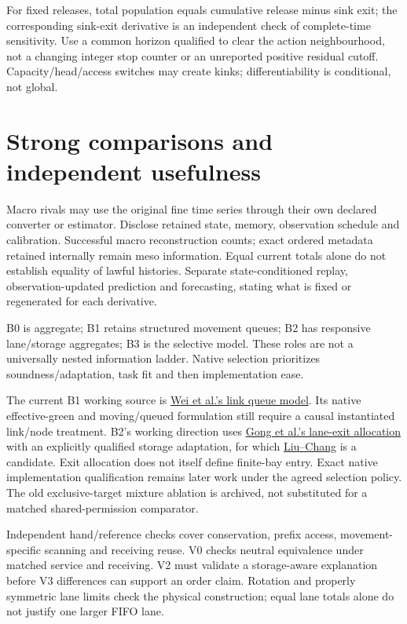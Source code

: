 \documentclass[11pt,a4paper]{article}
\begin{document}
For fixed releases, total population equals cumulative release minus
sink exit; the corresponding sink-exit derivative is an independent
check of complete-time sensitivity. Use a common horizon qualified to
clear the action neighbourhood, not a changing integer stop counter or
an unreported positive residual cutoff. Capacity/head/access switches
may create kinks; differentiability is conditional, not global.

\section{Strong comparisons and independent usefulness}

Macro rivals may use the original fine time series through their own
declared converter or estimator. Disclose retained state, memory,
observation schedule and calibration. Successful macro reconstruction
counts; exact ordered metadata retained internally remain meso information.
Equal current totals alone do not establish equality of lawful histories.
Separate state-conditioned replay, observation-updated prediction and
forecasting, stating what is fixed or regenerated for each derivative.

B0 is aggregate; B1 retains structured movement queues; B2 has responsive
lane/storage aggregates; B3 is the selective model. These roles are not
a universally nested information ladder. Native selection prioritizes
soundness/adaptation, task fit and then implementation ease.

The current B1 working source is
\href{https://arxiv.org/html/2310.12249v2}{Wei et al.'s link queue model}.
Its native effective-green and moving/queued formulation still require
a causal instantiated link/node treatment. B2's working direction uses
\href{https://www.sciencedirect.com/science/article/pii/S0191261525000578}
{Gong et al.'s lane-exit allocation} with an explicitly qualified storage
adaptation, for which
\href{https://attap.umd.edu/wp-content/uploads/2022/05/TRC522.pdf}
{Liu--Chang} is a candidate. Exit allocation does not itself define
finite-bay entry. Exact native implementation qualification remains
later work under the agreed selection policy.
The old exclusive-target mixture ablation is archived, not substituted
for a matched shared-permission comparator.

Independent hand/reference checks cover conservation, prefix access,
movement-specific scanning and receiving reuse. V0 checks neutral
equivalence under matched service and receiving. V2 must validate a
storage-aware explanation before V3 differences can support an order
claim. Rotation and properly symmetric lane limits check the physical
construction; equal lane totals alone do not justify one larger FIFO lane.
\end{document}
